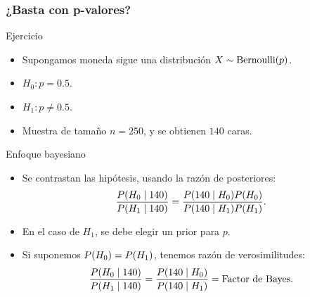 \documentclass[table]{beamer}
\begin{document}
\begin{frame}
    \frametitle{¿Basta con p-valores?}
    \begin{block}{Ejercicio}
        \begin{itemize}
            \item Supongamos moneda sigue una distribución $X \sim \bernoulli{p}$.
            \item $H_{0}: p = 0.5$.
            \item $H_{1}: p \neq 0.5$.
            \item Muestra de tamaño $n = 250$, y se obtienen $140$ caras.
        \end{itemize}
    \end{block}
    \begin{block}{Enfoque bayesiano}
        \begin{itemize}
            \item Se contrastan las hipótesis, usando la razón de posteriores:
                \begin{equation*}
                    \frac{\prob{H_{0} \mid 140}}{\prob{H_{1} \mid 140}} = \frac{\prob{140 \mid H_{0}} \prob{H_{0}}}{\prob{140 \mid H_{1}} \prob{H_{1}}} .
                \end{equation*}
            \item En el caso de $H_{1}$, se debe elegir un prior para $p$.
            \item Si suponemos $\prob{H_{0}} = \prob{H_{1}}$, tenemos razón de verosimilitudes:
                \begin{equation*}
                    \frac{\prob{H_{0} \mid 140}}{\prob{H_{1} \mid 140}} = \frac{\prob{140 \mid H_{0}}}{\prob{140 \mid H_{1}}} = \text{Factor de Bayes} .
                \end{equation*}
        \end{itemize}
    \end{block}
\end{frame}
\end{document}
